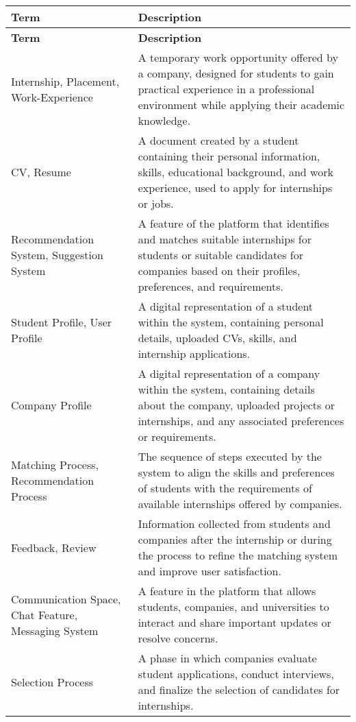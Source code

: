 \begin{longtable}{|p{}|p{}|}
    \hline
    \textbf{Term} & \textbf{Description} \\
    \hline
    \endfirsthead
    \hline
    \textbf{Term} & \textbf{Description} \\
    \hline
    \endhead
    \hline
    \endfoot
    
    Internship, Placement, Work-Experience & A temporary work opportunity offered by a company, designed for students to gain practical experience in a professional environment while applying their academic knowledge. \\
    \hline
    CV, Resume & A document created by a student containing their personal information, skills, educational background, and work experience, used to apply for internships or jobs. \\
    \hline
    Recommendation System, Suggestion System & A feature of the platform that identifies and matches suitable internships for students or suitable candidates for companies based on their profiles, preferences, and requirements. \\
    \hline
    Student Profile, User Profile & A digital representation of a student within the system, containing personal details, uploaded CVs, skills, and internship applications. \\
    \hline
    Company Profile & A digital representation of a company within the system, containing details about the company, uploaded projects or internships, and any associated preferences or requirements. \\
    \hline
    Matching Process, Recommendation Process & The sequence of steps executed by the system to align the skills and preferences of students with the requirements of available internships offered by companies. \\
    \hline
    Feedback, Review & Information collected from students and companies after the internship or during the process to refine the matching system and improve user satisfaction. \\
    \hline
    Communication Space, Chat Feature, Messaging System & A feature in the platform that allows students, companies, and universities to interact and share important updates or resolve concerns. \\
    \hline
    Selection Process & A phase in which companies evaluate student applications, conduct interviews, and finalize the selection of candidates for internships. \\

\end{longtable}
